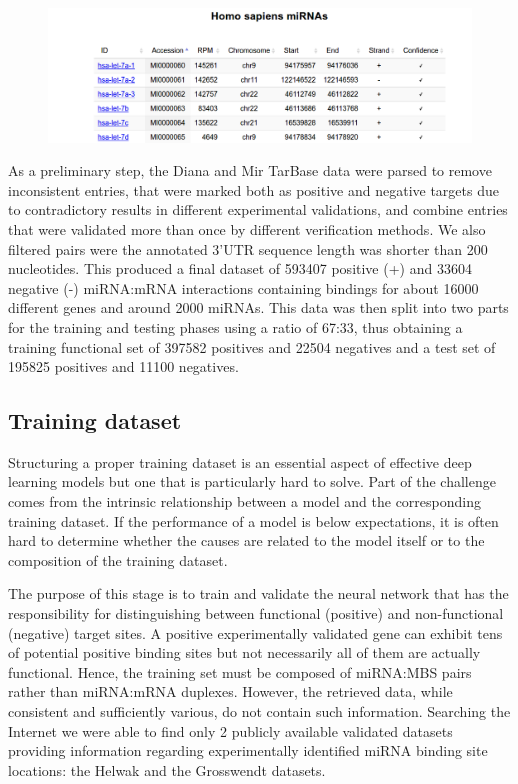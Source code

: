 \begin{figure}[hbt!]
	\centering
	\includegraphics[width=1\textwidth, height=0.3\textheight]{Figures/mirna_preview}
	\caption{}
	\label{fig:mirna_preview}
\end{figure}

As a preliminary step, the Diana and Mir TarBase data were parsed to remove inconsistent entries, that were marked both as positive and negative targets due to contradictory results in different experimental validations, and combine entries that were validated more than once by different verification methods. We also filtered pairs were the annotated 3'UTR sequence length was shorter than 200 nucleotides.  This produced a final dataset of 593407 positive (+) and 33604 negative (-) miRNA:mRNA interactions containing bindings for about 16000 different genes and around 2000 miRNAs. This data was then split into two parts for the training and testing phases using a ratio of 67:33, thus obtaining a training functional set of 397582 positives and 22504 negatives and a test set of 195825 positives and 11100 negatives.

\subsection{Training dataset}
Structuring a proper training dataset is an essential aspect of effective deep learning models but one that is particularly hard to solve. Part of the challenge comes from the intrinsic relationship between a model and the corresponding training dataset. If the performance of a model is below expectations, it is often hard to determine whether the causes are related to the model itself or to the composition of the training dataset.

The purpose of this stage is to train and validate the neural network that has the responsibility for distinguishing between functional (positive) and non-functional (negative) target sites. A positive experimentally validated gene can exhibit tens of potential positive binding sites but not necessarily all of them are actually functional. Hence, the training set must be composed of miRNA:MBS pairs rather than miRNA:mRNA duplexes. However, the retrieved data, while consistent and sufficiently various, do not contain such information. Searching the Internet we were able to find only 2 publicly available validated datasets providing information regarding experimentally identified miRNA binding site locations: the Helwak \cite{helwak} and the Grosswendt \cite{grosswendt} datasets.


